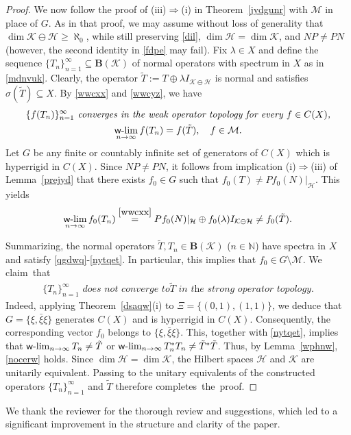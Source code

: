 \documentclass[reqno]{amsproc}
\numberwithin{equation}{section}
\theoremstyle{remark}
\newcommand*{\hh}{\mathcal{H}}
\newcommand*{\kk}{\mathcal{K}}
\newcommand*{\natu}{\mathbb{N}}
\newcommand*{\mcal}{\mathcal{M}}
\theoremstyle{definition}
\newcommand*{\Ge}{\geqslant}
\newcommand*{\ogr}{\boldsymbol{B}}
\def\wwlim{\qopname\relax m{{\sf{w}\textrm-}lim}}
\begin{document}
\begin{proof}
We now follow the proof of (iii)$\Rightarrow$(i) in
Theorem~\ref{jydgunr} with $\mcal$ in place of $G$. As
in that proof, we may assume without loss of
generality that $\dim \kk \ominus \hh\Ge \aleph_0$,
while still preserving \eqref{dil}, $\dim \hh = \dim
\kk$, and $NP\neq PN$ (however, the second identity in
\eqref{fdpe} may fail). Fix $\lambda\in X$ and define
the sequence $\{T_n\}_{n=1}^{\infty} \subseteq
\ogr(\kk)$ of normal operators with spectrum in $X$ as
in \eqref{mdnvuk}. Clearly, the operator $\tilde T:=T
\oplus \lambda I_{\kk\ominus \hh}$ is normal and
satisfies $\sigma(\tilde T) \subseteq X$. By
\eqref{wwcxx} and \eqref{wwcyz}, we have
   \allowdisplaybreaks
   \begin{gather} \label{qgdwq}
\textit{$\{f(T_n)\}_{n=1}^{\infty}$ converges in the
weak operator topology for every $f\in C(X)$,}
   \\ \label{gdwq}
\wwlim_{n\to\infty} f(T_n) =
f(\tilde T), \quad f\in \mcal.
   \end{gather}
Let $G$ be any finite or countably infinite set of
generators of $C(X)$ which is hyperrigid in $C(X)$.
Since $NP\neq PN$, it follows from implication
(i)$\Rightarrow$(iii) of Lemma~\ref{prejyd} that there
exists $f_0\in G$ such that $f_0(T) \neq P
f_0(N)|_{\hh}$. This yields
   \begin{align} \label{nytqet}
\wwlim_{n\to\infty} f_0(T_n) \overset{\eqref{wwcxx}}=
P f_0(N)|_{\hh} \oplus f_0(\lambda) I_{\kk\ominus \hh}
\neq f_0(\tilde T).
   \end{align}

Summarizing, the normal operators $\tilde T, T_n\in
\ogr(\kk)$ ($n\in \natu$) have spectra in $X$ and
satisfy \eqref{qgdwq}-\eqref{nytqet}. In particular,
this implies that $f_0\in G \setminus \mcal$. We
claim~that
   \begin{align} \label{nocerw}
\textit{$\{T_n\}_{n=1}^{\infty}$ does not converge to
$\tilde T$ in the strong operator topology.}
   \end{align}
Indeed, applying Theorem~\ref{dsaqw}(i) to
$\varXi=\{(0,1), (1,1)\}$, we deduce that
$G=\{\xi,\bar \xi \xi\}$ generates $C(X)$ and is
hyperrigid in $C(X)$. Consequently, the corresponding
vector $f_0$ belongs to $\{\xi,\bar \xi \xi\}$. This,
together with \eqref{nytqet}, implies that
$\wwlim_{n\to\infty} T_n \neq \tilde T$ or
$\wwlim_{n\to\infty} T_n^*T_n \neq \tilde T^* \tilde
T$. Thus, by Lemma~\ref{wphnw}, \eqref{nocerw} holds.
Since \(\dim \hh=\dim \kk\), the Hilbert spaces
\(\hh\) and \(\kk\) are unitarily equivalent. Passing
to the unitary equivalents of the constructed
operators \(\{T_n\}_{n=1}^{\infty}\) and \(\tilde T\)
therefore completes~the~proof.
  \end{proof}
 We thank the reviewer
for the thorough review and suggestions, which led to
a significant improvement in the structure and clarity
of the paper.
   \appendix
\end{document}
